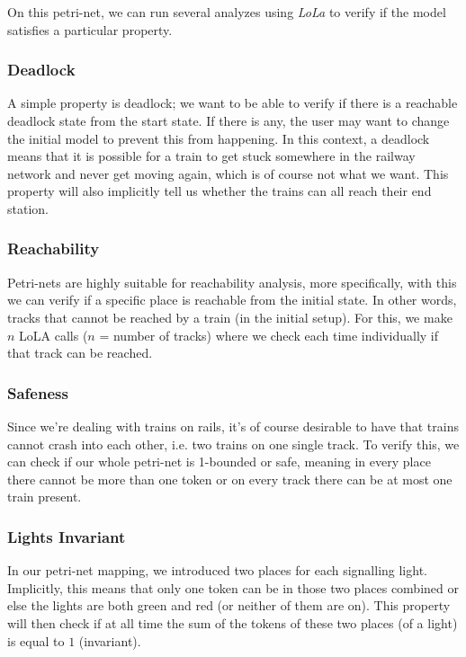 \documentclass{article}
\begin{document}
On this petri-net, we can run several analyzes using \textit{LoLa} to verify if the model satisfies a particular property.

\subsubsection{Deadlock}

A simple property is deadlock; we want to be able to verify if there is a reachable deadlock state from the start state. If there is any, the user may want to change the initial model to prevent this from happening. In this context, a deadlock means that it is possible for a train to get stuck somewhere in the railway network and never get moving again, which is of course not what we want. This property will also implicitly tell us whether the trains can all reach their end station.

\subsubsection{Reachability}

Petri-nets are highly suitable for reachability analysis, more specifically, with this we can verify if a specific place is reachable from the initial state. In other words, tracks that cannot be reached by a train (in the initial setup). For this, we make $n$ LoLA calls ($n$ = number of tracks) where we check each time individually if that track can be reached.

\subsubsection{Safeness}

Since we're dealing with trains on rails, it's of course desirable to have that trains cannot crash into each other, i.e. two trains on one single track. To verify this, we can check if our whole petri-net is 1-bounded or safe, meaning in every place there cannot be more than one token or on every track there can be at most one train present.

\subsubsection{Lights Invariant}

In our petri-net mapping, we introduced two places for each signalling light. Implicitly, this means that only one token can be in those two places combined or else the lights are both green and red (or neither of them are on). This property will then check if at all time the sum of the tokens of these two places (of a light) is equal to $1$ (invariant).
\end{document}
